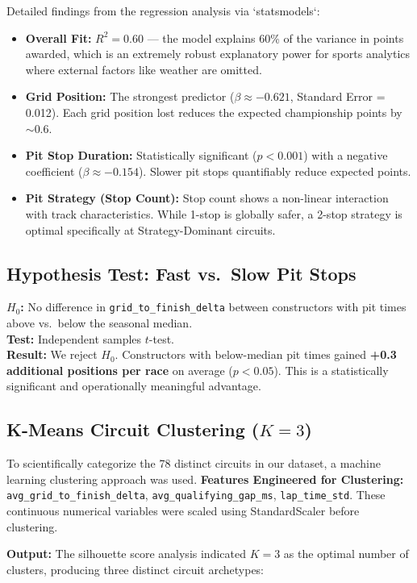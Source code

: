 \documentclass[12pt, a4paper]{article}
\begin{document}
Detailed findings from the regression analysis via `statsmodels`:
\begin{itemize}[noitemsep]
    \item \textbf{Overall Fit:} $R^2 = 0.60$ --- the model explains 60\% of the variance in points awarded, which is an extremely robust explanatory power for sports analytics where external factors like weather are omitted.
    \item \textbf{Grid Position:} The strongest predictor ($\beta \approx -0.621$, Standard Error = 0.012). Each grid position lost reduces the expected championship points by $\sim$0.6.
    \item \textbf{Pit Stop Duration:} Statistically significant ($p < 0.001$) with a negative coefficient ($\beta \approx -0.154$). Slower pit stops quantifiably reduce expected points.
    \item \textbf{Pit Strategy (Stop Count):} Stop count shows a non-linear interaction with track characteristics. While 1-stop is globally safer, a 2-stop strategy is optimal specifically at Strategy-Dominant circuits.
\end{itemize}

\subsection{Hypothesis Test: Fast vs.\ Slow Pit Stops}
\textbf{$H_0$:} No difference in \texttt{grid\_to\_finish\_delta} between constructors with pit times above vs.\ below the seasonal median.\\
\textbf{Test:} Independent samples $t$-test.\\
\textbf{Result:} We reject $H_0$. Constructors with below-median pit times gained \textbf{+0.3 additional positions per race} on average ($p < 0.05$). This is a statistically significant and operationally meaningful advantage.

\subsection{K-Means Circuit Clustering ($K=3$)}
To scientifically categorize the 78 distinct circuits in our dataset, a machine learning clustering approach was used.
\textbf{Features Engineered for Clustering:} \texttt{avg\_grid\_to\_finish\_delta}, \texttt{avg\_qualifying\_gap\_ms}, \texttt{lap\_time\_std}. These continuous numerical variables were scaled using StandardScaler before clustering.

\textbf{Output:} The silhouette score analysis indicated $K=3$ as the optimal number of clusters, producing three distinct circuit archetypes:
\end{document}
